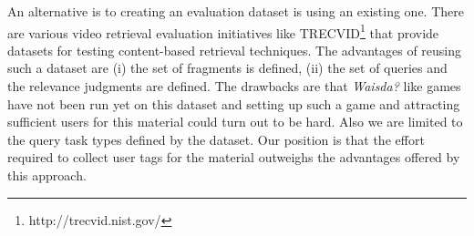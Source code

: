 An alternative is to creating an evaluation dataset is using an existing one. There are various video retrieval evaluation initiatives like TRECVID\footnote{http://trecvid.nist.gov/} that provide datasets for testing content-based retrieval techniques. The advantages of reusing such a dataset are (i) the set of fragments is defined, (ii) the set of queries and the relevance judgments are defined. The drawbacks are that \textit{Waisda?} like games have not been run yet on this dataset and setting up such a game and attracting sufficient users for this material could turn out to be hard. Also we are limited to the query task types defined by the dataset. Our position is that the effort required to collect user tags for the material outweighs the advantages offered by this approach.
	



